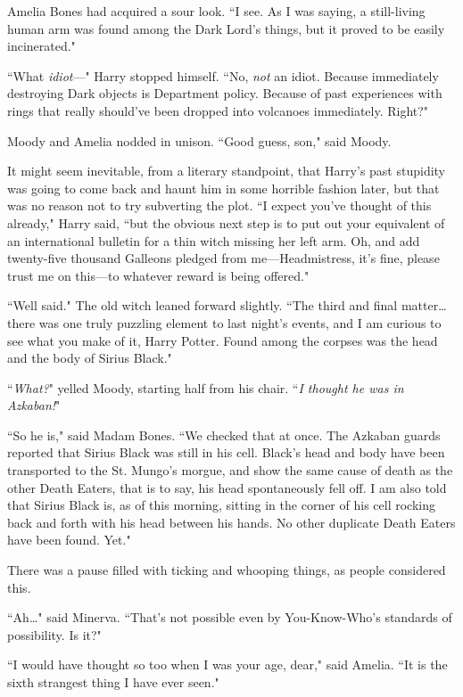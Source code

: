 Amelia Bones had acquired a sour look. ``I see. As I was saying, a still-living human arm was found among the Dark Lord's things, but it proved to be easily incinerated."

``What \emph{idiot}---" Harry stopped himself. ``No, \emph{not} an idiot. Because immediately destroying Dark objects is Department policy. Because of past experiences with rings that really should've been dropped into volcanoes immediately. Right?"

Moody and Amelia nodded in unison. ``Good guess, son," said Moody.

It might seem inevitable, from a literary standpoint, that Harry's past stupidity was going to come back and haunt him in some horrible fashion later, but that was no reason not to try subverting the plot. ``I expect you've thought of this already," Harry said, ``but the obvious next step is to put out your equivalent of an international bulletin for a thin witch missing her left arm. Oh, and add twenty-five thousand Galleons pledged from me---Headmistress, it's fine, please trust me on this---to whatever reward is being offered."

``Well said." The old witch leaned forward slightly. ``The third and final matter{\ldots} there was one truly puzzling element to last night's events, and I am curious to see what you make of it, Harry Potter. Found among the corpses was the head and the body of Sirius Black."

``\emph{What?}" yelled Moody, starting half from his chair. ``\emph{I thought he was in Azkaban!}"

``So he is," said Madam Bones. ``We checked that at once. The Azkaban guards reported that Sirius Black was still in his cell. Black's head and body have been transported to the St. Mungo's morgue, and show the same cause of death as the other Death Eaters, that is to say, his head spontaneously fell off. I am also told that Sirius Black is, as of this morning, sitting in the corner of his cell rocking back and forth with his head between his hands. No other duplicate Death Eaters have been found. Yet."

There was a pause filled with ticking and whooping things, as people considered this.

``Ah{\ldots}" said Minerva. ``That's not possible even by You-Know-Who's standards of possibility. Is it?"

``I would have thought so too when I was your age, dear," said Amelia. ``It is the sixth strangest thing I have ever seen."

